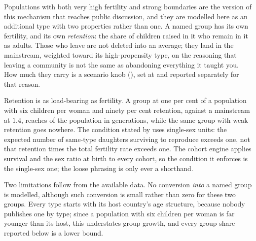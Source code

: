Populations with both very high fertility and strong boundaries are the version
of this mechanism that reaches public discussion, and they are modelled here as
an additional type with two properties rather than one. A named group has its own
fertility, and its own \emph{retention}: the share of children raised in it who
remain in it as adults. Those who leave are not deleted into an average; they
land in the mainstream, weighted toward its high-propensity type, on the
reasoning that leaving a community is not the same as abandoning everything it
taught you. How much they carry is a scenario knob (), set
at \DefectorWeight{} and reported separately for that reason.

Retention is as load-bearing as fertility. A group at one per cent of a
population with six children per woman and ninety per cent retention, against a
mainstream at $1.4$, reaches \ToyFinalShare{} of the population in
\ToyGenerations{} generations, while the same group with weak retention goes
nowhere. The condition stated by \citet{arenberg2022} uses single-sex units: the expected
number of same-type daughters surviving to reproduce exceeds one, not that
retention times the total fertility rate exceeds one. The cohort engine applies
survival and the sex ratio at birth to every cohort, so the condition it enforces
is the single-sex one; the loose phrasing is only ever a shorthand.

Two limitations follow from the available data. No conversion \emph{into} a named
group is modelled, although such conversion is small rather than zero for these
two groups. Every type
starts with its host country's age structure, because nobody publishes one by
type; since a population with six children per woman is far younger than its
host, this understates group growth, and every group share reported below is a
lower bound.
